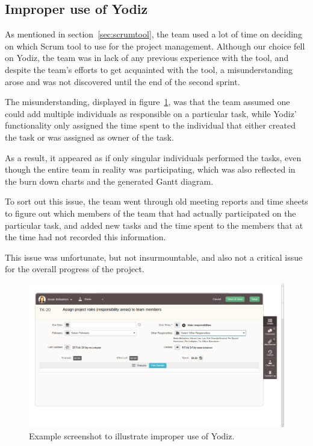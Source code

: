 \subsection{Improper use of Yodiz}
\label{sec:improperScrum}
As mentioned in section~\ref{sec:scrumtool}, the team used a lot of time on
deciding on which Scrum tool to use for the project management. Although our
choice fell on Yodiz, the team was in lack of any previous experience with the
tool, and despite the team's efforts to get acquainted with the tool, a
misunderstanding arose and was not discovered until the end of the second
sprint.

The misunderstanding, displayed in figure~\ref{fig:wrongUse}, was that the team
assumed one could add multiple individuals as responsible on a particular task,
while Yodiz' functionality only assigned the time spent to the individual that
either created the task or was assigned as owner of the task.

As a result, it appeared as if only singular individuals performed the tasks,
even though the entire team in reality was participating, which was also
reflected in the burn down charts and the generated Gantt diagram. 

To sort out this issue, the team went through old meeting reports and time sheets
to figure out which members of the team that had actually participated on the
particular task, and added new tasks and the time spent to the members that at
the time had not recorded this information.%

This issue was unfortunate, but not insurmountable, and also not a critical
issue for the overall progress of the project.

\begin{figure}[H]
\includegraphics[width=\textwidth, clip, trim=1cm 2cm 4cm 1cm]{ch/retrospect/fig/wrongUse.png}
\caption{Example screenshot to illustrate improper use of Yodiz.}
\label{fig:wrongUse}
\end{figure}
